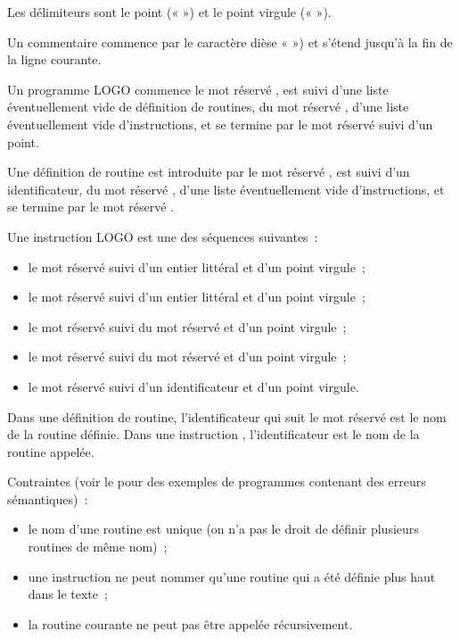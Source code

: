 Les délimiteurs sont le point («  ») et le point virgule (« \tpp{;} »).

Un commentaire commence par le caractère dièse « \tpp{\#} ») et s'étend jusqu'à la fin de la ligne courante.



Un programme LOGO commence le mot réservé , est suivi d'une liste éventuellement vide de définition de routines, du mot réservé , d'une liste éventuellement vide d'instructions, et se termine par le mot réservé  suivi d'un point.

Une définition de routine est introduite par le mot réservé , est suivi d'un identificateur, du mot réservé , d'une liste éventuellement vide d'instructions, et se termine par le mot réservé .

Une instruction LOGO est une des séquences suivantes~:
\begin{itemize}
  \item le mot réservé  suivi d'un entier littéral et d'un point virgule~;
  \item le mot réservé  suivi d'un entier littéral et d'un point virgule~;
  \item le mot réservé  suivi du mot réservé  et d'un point virgule~;
  \item le mot réservé  suivi du mot réservé  et d'un point virgule~;
  \item le mot réservé  suivi d'un identificateur et d'un point virgule.
\end{itemize}


Dans une définition de routine, l'identificateur qui suit le mot réservé  est le nom de la routine définie. Dans une instruction , l'identificateur est le nom de la routine appelée.

Contraintes (voir le  pour des exemples de programmes contenant des erreurs sémantiques)~:
\begin{itemize}
  \item le nom d'une routine est unique (on n'a pas le droit de définir plusieurs routines de même nom)~;
  \item une instruction  ne peut nommer qu'une routine qui a été définie plus haut dans le texte~;
  \item la routine courante ne peut pas être appelée récursivement.
\end{itemize}


